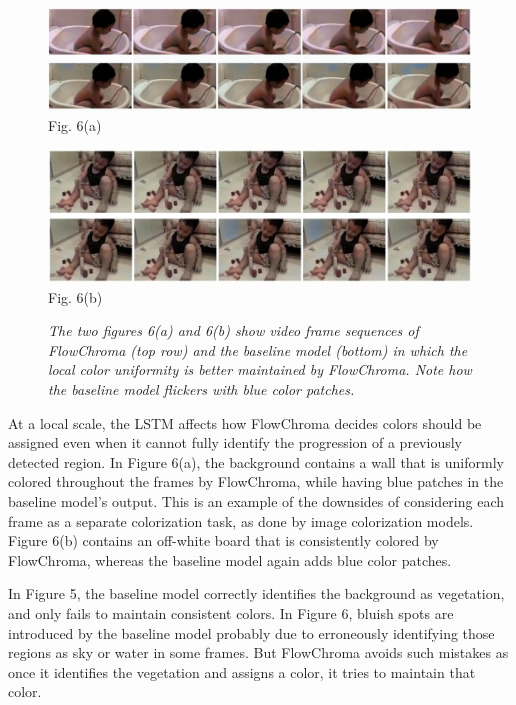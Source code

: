 \documentclass[10pt,twocolumn,letterpaper]{article}
\begin{document}
\begin{figure}[!h]
\includegraphics[width=\textwidth]{fc-dk-baby-tub.png}
\label{}{\footnotesize Fig. 6(a)}
\vspace{5.00mm}
\end{figure}

\begin{figure}[!h]
\includegraphics[width=\textwidth]{fc-dk-playing.png}
\label{}{\footnotesize Fig. 6(b)}
\caption{\textit{The two figures 6(a) and 6(b) show video frame sequences of FlowChroma (top row) and the baseline model (bottom) in which the local color uniformity is better maintained by FlowChroma. Note how the baseline model flickers with blue color patches.}}
\end{figure}

At a local scale, the LSTM affects how FlowChroma decides colors should be assigned even when it cannot fully identify the progression of a previously detected region. In Figure 6(a), the background contains a wall that is uniformly colored throughout the frames by FlowChroma, while having blue patches in the baseline model’s output. This is an example of the downsides of considering each frame as a separate colorization task, as done by image colorization models. Figure 6(b) contains an off-white board that is consistently colored by FlowChroma, whereas the baseline model again adds blue color patches.

In Figure 5, the baseline model correctly identifies the background as vegetation, and only fails to maintain consistent colors. In Figure 6, bluish spots are introduced by the baseline model probably due to erroneously identifying those regions as sky or water in some frames. But FlowChroma avoids such mistakes as once it identifies the vegetation and assigns a color, it tries to maintain that color.
\end{document}
